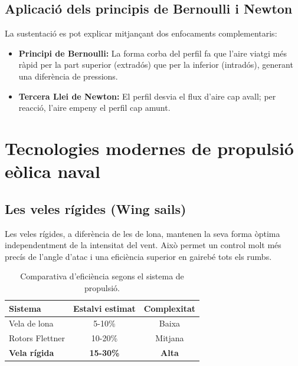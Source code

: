 \section{Aplicació dels principis de Bernoulli i Newton}

La sustentació es pot explicar mitjançant dos enfocaments complementaris:
\begin{itemize}
    \item \textbf{Principi de Bernoulli:} La forma corba del perfil fa que l'aire viatgi més ràpid per la part superior (extradós) que per la inferior (intradós), generant una diferència de pressions.
    \item \textbf{Tercera Llei de Newton:} El perfil desvia el flux d'aire cap avall; per reacció, l'aire empeny el perfil cap amunt.
\end{itemize}

\chapter{Tecnologies modernes de propulsió eòlica naval}
\section{Les veles rígides (Wing sails)}

Les veles rígides, a diferència de les de lona, mantenen la seva forma òptima independentment de la intensitat del vent. Això permet un control molt més precís de l'angle d'atac i una eficiència superior en gairebé tots els rumbs.

\begin{table}[H]
    \centering
    \caption{Comparativa d'eficiència segons el sistema de propulsió.}
    \begin{tabular}{lcc}
        \toprule
        \textbf{Sistema} & \textbf{Estalvi estimat} & \textbf{Complexitat} \\
        \midrule
        Vela de lona & 5-10\% & Baixa \\
        Rotors Flettner & 10-20\% & Mitjana \\
        \textbf{Vela rígida} & \textbf{15-30\%} & \textbf{Alta} \\
        \bottomrule
    \end{tabular}
    \label{tab:comparativa}
\end{table}
